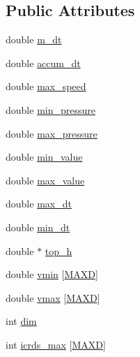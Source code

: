 \subsection*{Public Attributes}
\begin{DoxyCompactItemize}
\item 
double \hyperlink{class_incompress___solver___smooth___basis_a01a2748ba6a9fd98db8fa120074bb334}{m\+\_\+dt}
\item 
double \hyperlink{class_incompress___solver___smooth___basis_a32b48778fbfca8db41b1a387612b5c74}{accum\+\_\+dt}
\item 
double \hyperlink{class_incompress___solver___smooth___basis_aade48c95c92138da2ab4db924c960255}{max\+\_\+speed}
\item 
double \hyperlink{class_incompress___solver___smooth___basis_aea0ab50c8c45ab34bcd88439f32d9a4e}{min\+\_\+pressure}
\item 
double \hyperlink{class_incompress___solver___smooth___basis_a9123e8271d9c83b7b886fa6a983b65b9}{max\+\_\+pressure}
\item 
double \hyperlink{class_incompress___solver___smooth___basis_a59f256f38196b8666ab54c6f164b43a0}{min\+\_\+value}
\item 
double \hyperlink{class_incompress___solver___smooth___basis_a3b56f4a603e152e1e8b24b624ba426f9}{max\+\_\+value}
\item 
double \hyperlink{class_incompress___solver___smooth___basis_a96e9463787fc08bb925f939f63266e72}{max\+\_\+dt}
\item 
double \hyperlink{class_incompress___solver___smooth___basis_a5e3c3f602f0d8bb5a26fbde765eb500f}{min\+\_\+dt}
\item 
double $\ast$ \hyperlink{class_incompress___solver___smooth___basis_a4d10d59710621f01cdb2944a4b6024ed}{top\+\_\+h}
\item 
double \hyperlink{class_incompress___solver___smooth___basis_a0f5db6627058f29c053f3ac6e3fa6a7f}{vmin} \mbox{[}\hyperlink{geom_8h_aabfcbcb5ac86a1edac4035264bc7d2b8ac79558c6c6666a44ddf7e701241b8211}{M\+A\+XD}\mbox{]}
\item 
double \hyperlink{class_incompress___solver___smooth___basis_a245b31f906cafcf80a2cc0910ff89d01}{vmax} \mbox{[}\hyperlink{geom_8h_aabfcbcb5ac86a1edac4035264bc7d2b8ac79558c6c6666a44ddf7e701241b8211}{M\+A\+XD}\mbox{]}
\item 
int \hyperlink{class_incompress___solver___smooth___basis_a339d3315db4ae6cae79f55a1e14fe672}{dim}
\item 
int \hyperlink{class_incompress___solver___smooth___basis_aeca5693a734c264eee923f8b0a99a4d2}{icrds\+\_\+max} \mbox{[}\hyperlink{geom_8h_aabfcbcb5ac86a1edac4035264bc7d2b8ac79558c6c6666a44ddf7e701241b8211}{M\+A\+XD}\mbox{]}

\end{DoxyCompactItemize}
